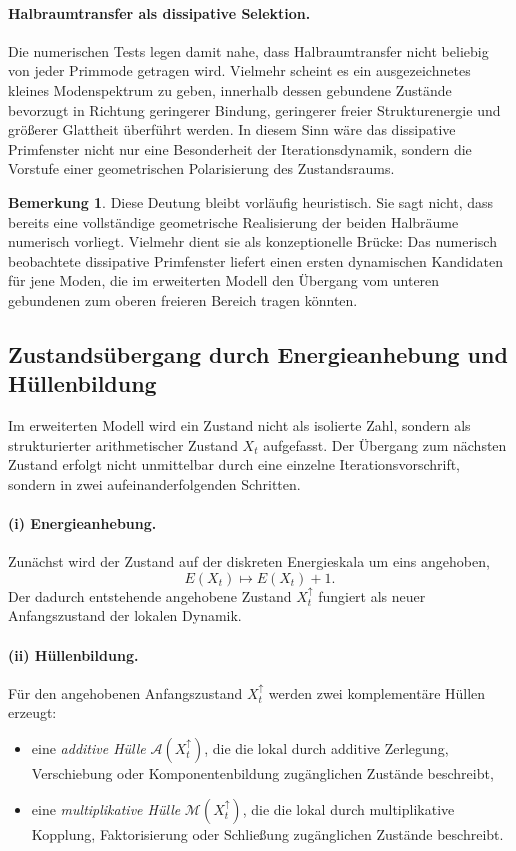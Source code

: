 \documentclass[11pt,a4paper]{article}
\theoremstyle{definition}
\newtheorem{bemerkung}{Bemerkung}
\begin{document}
\paragraph{Halbraumtransfer als dissipative Selektion.}
Die numerischen Tests legen damit nahe, dass Halbraumtransfer nicht beliebig von jeder Primmode getragen wird. Vielmehr scheint es ein ausgezeichnetes kleines Modenspektrum zu geben, innerhalb dessen gebundene Zustände bevorzugt in Richtung geringerer Bindung, geringerer freier Strukturenergie und größerer Glattheit überführt werden. In diesem Sinn wäre das dissipative Primfenster nicht nur eine Besonderheit der Iterationsdynamik, sondern die Vorstufe einer geometrischen Polarisierung des Zustandsraums.

\begin{bemerkung}
	Diese Deutung bleibt vorläufig heuristisch. Sie sagt nicht, dass bereits eine vollständige geometrische Realisierung der beiden Halbräume numerisch vorliegt. Vielmehr dient sie als konzeptionelle Brücke: Das numerisch beobachtete dissipative Primfenster liefert einen ersten dynamischen Kandidaten für jene Moden, die im erweiterten Modell den Übergang vom unteren gebundenen zum oberen freieren Bereich tragen könnten.
\end{bemerkung}
\subsection{Zustandsübergang durch Energieanhebung und Hüllenbildung}

Im erweiterten Modell wird ein Zustand nicht als isolierte Zahl, sondern als strukturierter arithmetischer Zustand \(X_t\) aufgefasst. Der Übergang zum nächsten Zustand erfolgt nicht unmittelbar durch eine einzelne Iterationsvorschrift, sondern in zwei aufeinanderfolgenden Schritten.

\paragraph{(i) Energieanhebung.}
Zunächst wird der Zustand auf der diskreten Energieskala um eins angehoben,
\[
E(X_t)\mapsto E(X_t)+1.
\]
Der dadurch entstehende angehobene Zustand \(X_t^\uparrow\) fungiert als neuer Anfangszustand der lokalen Dynamik.

\paragraph{(ii) Hüllenbildung.}
Für den angehobenen Anfangszustand \(X_t^\uparrow\) werden zwei komplementäre Hüllen erzeugt:
\begin{itemize}
	\item eine \emph{additive Hülle} \(\mathcal{A}(X_t^\uparrow)\), die die lokal durch additive Zerlegung, Verschiebung oder Komponentenbildung zugänglichen Zustände beschreibt,
	\item eine \emph{multiplikative Hülle} \(\mathcal{M}(X_t^\uparrow)\), die die lokal durch multiplikative Kopplung, Faktorisierung oder Schließung zugänglichen Zustände beschreibt.
\end{itemize}
\end{document}

